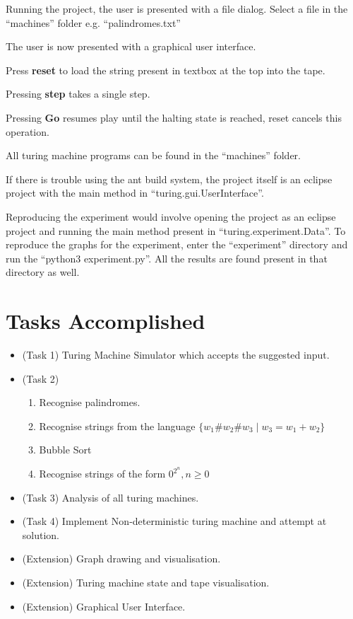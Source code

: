 \documentclass{article}
\begin{document}
Running the project, the user is presented with a file dialog. Select a file in the ``machines'' folder e.g. ``palindromes.txt''

The user is now presented with a graphical user interface.

Press \textbf{reset} to load the string present in textbox at the top into the tape.

Pressing \textbf{step} takes a single step.

Pressing \textbf{Go} resumes play until the halting state is reached, reset cancels this operation.

All turing machine programs can be found in the ``machines'' folder.

If there is trouble using the ant build system, the project itself is an eclipse project with the main method in ``turing.gui.UserInterface''.

Reproducing the experiment would involve opening the project as an eclipse project and running the main method present in ``turing.experiment.Data''.  To reproduce the graphs for the experiment, enter the ``experiment'' directory and run the ``python3 experiment.py''. All the results are found present in that directory as well.

\section{Tasks Accomplished}

\begin{itemize}
\item (Task 1) Turing Machine Simulator which accepts the suggested input. 
\item (Task 2) 
  \begin{enumerate}
  \item Recognise palindromes.
  \item Recognise strings from the language $ \{ w_1\#w_2\#w_3 \mid w_3 = w_1 + w_2 \} $
  \item Bubble Sort
  \item Recognise strings of the form $0^{2^n}, n \geq 0$
  \end{enumerate}
\item (Task 3) Analysis of all turing machines.
\item (Task 4) Implement Non-deterministic turing machine and attempt at solution.
\item (Extension) Graph drawing and visualisation.
\item (Extension) Turing machine state and tape visualisation.
\item (Extension) Graphical User Interface.
  
\end{itemize}
\end{document}
